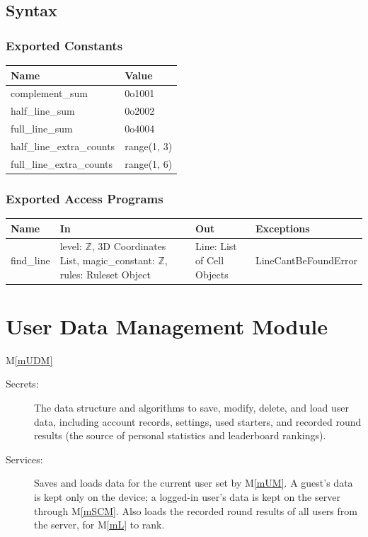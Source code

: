 \documentclass[12pt, titlepage]{article}
\newcommand{\mref}[1]{M\ref{#1}}
\begin{document}
\subsection{Syntax}

\subsubsection{Exported Constants}

\begin{center}
\begin{tabular}{p{10cm} p{4cm}}
\hline
\textbf{Name} & \textbf{Value}\\
\hline
complement\_sum&0o1001 \\
half\_line\_sum&0o2002 \\
full\_line\_sum&0o4004 \\
half\_line\_extra\_counts&range(1, 3) \\
full\_line\_extra\_counts&range(1, 6) \\

\hline
\end{tabular}
\end{center}

\subsubsection{Exported Access Programs}

\begin{center}
\begin{tabular}{p{4cm} p{4cm} p{4cm} p{4cm}}
\hline
\textbf{Name} & \textbf{In} & \textbf{Out} & \textbf{Exceptions} \\
\hline
find\_line & level: $\mathbb{Z}$, 3D Coordinates List, magic\_constant: $\mathbb{Z}$, rules: Ruleset Object  & Line: List of Cell Objects & LineCantBeFoundError \\
\hline
\end{tabular}
\end{center}

\newpage

\section{User Data Management Module} \mref{mUDM} 


\begin{description}
\item[Secrets:] The data structure and algorithms to save, modify, delete, and load user data, including account records, settings, used starters, and recorded round results (the source of personal statistics and leaderboard rankings).
\item[Services:] Saves and loads data for the current user set by \mref{mUM}. A guest's data is kept only on the device; a logged-in user's data is kept on the server through \mref{mSCM}. Also loads the recorded round results of all users from the server, for \mref{mL} to rank.
\end{description}
\end{document}
